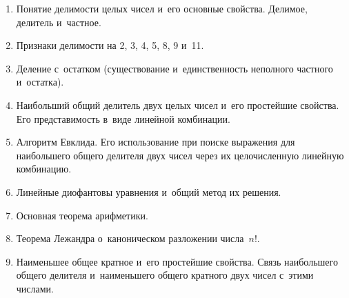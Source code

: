 \documentclass[a4paper,12pt]{article}
\begin{document}
\begin{enumerate}
\item Понятие делимости целых чисел и~его основные свойства. Делимое, делитель и~частное.
\item Признаки делимости на 2, 3, 4, 5, 8, 9 и~11.
\item Деление с~остатком (существование и~единственность неполного частного и~остатка).
\item Наибольший общий делитель двух целых чисел и~его простейшие свойства. Его представимость в~виде линейной комбинации.
\item Алгоритм Евклида. Его использование при поиске выражения для наибольшего общего делителя двух чисел через их целочисленную линейную комбинацию.
\item Линейные диофантовы уравнения и~общий метод их решения.
\item Основная теорема арифметики.
\item Теорема Лежандра о~каноническом разложении числа~$n!$.
\item Наименьшее общее кратное и~его простейшие свойства. Связь наибольшего общего делителя и~наименьшего общего кратного двух чисел с~этими числами.
\\


\end{enumerate}

\newpage
\end{document}
